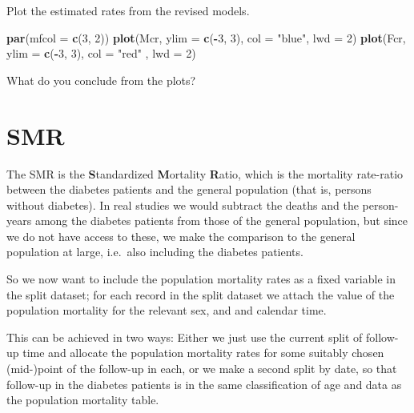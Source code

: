 \documentclass[
]{book}
\newenvironment{Shaded}{\begin{snugshade}}{\end{snugshade}}
\newcommand{\AttributeTok}[1]{\textcolor[rgb]{0.13,0.29,0.53}{#1}}
\newcommand{\DecValTok}[1]{\textcolor[rgb]{0.00,0.00,0.81}{#1}}
\newcommand{\FunctionTok}[1]{\textcolor[rgb]{0.13,0.29,0.53}{\textbf{#1}}}
\newcommand{\NormalTok}[1]{#1}
\newcommand{\SpecialCharTok}[1]{\textcolor[rgb]{0.81,0.36,0.00}{\textbf{#1}}}
\newcommand{\StringTok}[1]{\textcolor[rgb]{0.31,0.60,0.02}{#1}}
\begin{document}
\begin{enumerate}
  Plot the estimated rates from the revised models.

\begin{Shaded}
\begin{Highlighting}[]
\FunctionTok{par}\NormalTok{(}\AttributeTok{mfcol =} \FunctionTok{c}\NormalTok{(}\DecValTok{3}\NormalTok{, }\DecValTok{2}\NormalTok{))}
\FunctionTok{plot}\NormalTok{(Mcr, }\AttributeTok{ylim =} \FunctionTok{c}\NormalTok{(}\SpecialCharTok{{-}}\DecValTok{3}\NormalTok{, }\DecValTok{3}\NormalTok{), }\AttributeTok{col =} \StringTok{"blue"}\NormalTok{, }\AttributeTok{lwd =} \DecValTok{2}\NormalTok{)}
\FunctionTok{plot}\NormalTok{(Fcr, }\AttributeTok{ylim =} \FunctionTok{c}\NormalTok{(}\SpecialCharTok{{-}}\DecValTok{3}\NormalTok{, }\DecValTok{3}\NormalTok{), }\AttributeTok{col =} \StringTok{"red"}\NormalTok{ , }\AttributeTok{lwd =} \DecValTok{2}\NormalTok{)}
\end{Highlighting}
\end{Shaded}

  What do you conclude from the plots?
\end{enumerate}

\section{SMR}\label{smr}

The SMR is the \textbf{S}tandardized \textbf{M}ortality
\textbf{R}atio, which is the mortality rate-ratio between the diabetes
patients and the general population (that is, persons without
diabetes). In real studies we would
subtract the deaths and the person-years among the diabetes patients
from those of the general population, but since we do not have access
to these, we make the comparison to the general population at large,
i.e.~also including the diabetes patients.

So we now want to include the population mortality rates as a fixed
variable in the split dataset; for each record in the split dataset we
attach the value of the population mortality for the relevant sex, and
and calendar time.

This can be achieved in two ways: Either we just use the current split
of follow-up time and allocate the population mortality rates for some
suitably chosen (mid-)point of the follow-up in each, or we make a
second split by date, so that follow-up in the diabetes patients is in
the same classification of age and data as the population mortality
table.
\end{document}

